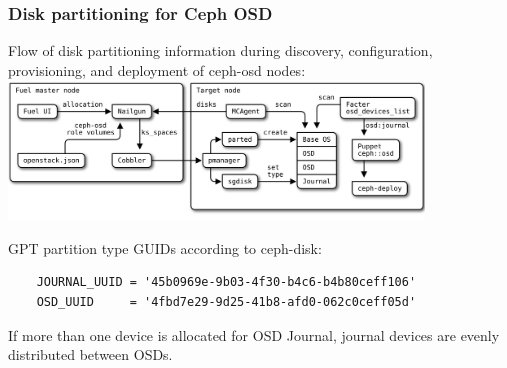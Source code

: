 \documentclass[hyperref=unicode,utf8,xcolor=pst,aspectratio=169]{beamer}
\begin{document}
\begin{frame}[fragile]
	\frametitle{Disk partitioning for Ceph OSD}
	Flow of disk partitioning information during discovery, configuration,
	provisioning, and deployment of ceph-osd nodes:\\
	\vspace{1ex}
	\includegraphics[height=3.7cm]{osd-disks}

	GPT partition type GUIDs according to ceph-disk:
	\begin{lstlisting}
	JOURNAL_UUID = '45b0969e-9b03-4f30-b4c6-b4b80ceff106'
	OSD_UUID     = '4fbd7e29-9d25-41b8-afd0-062c0ceff05d'
	\end{lstlisting}

	\vspace{1ex}
	If more than one device is allocated for OSD Journal, journal
	devices are evenly distributed between OSDs.
\end{frame}
\end{document}
